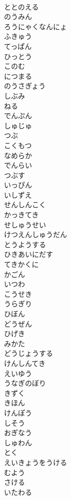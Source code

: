 \documentclass[8pt]{extreport}
\begin{document}
\begin{CJK}{UTF8}{min}
\\	ととのえる
\\	のうみん
\\	ろうにゃくなんにょ
\\	ふきゅう
\\	てっぱん
\\	ひっとう
\\	このむ
\\	につまる
\\	のうさぎょう
\\	しぶみ
\\	ねる
\\	でんぷん
\\	しゅじゅ
\\	つぶ
\\	こくもつ
\\	なめらか
\\	でんらい
\\	つぶす
\\	いっぴん
\\	いしずえ
\\	せんしんこく
\\	かっきてき
\\	せしゅうせい
\\	けつえんしゅうだん
\\	とうようする
\\	ひきあいにだす
\\	てきかくに
\\	かごん
\\	いつわ
\\	こうせき
\\	うらぎり
\\	ひぼん
\\	どうぜん
\\	ひげき
\\	みかた
\\	どうじょうする
\\	けんしんてき
\\	えいゆう
\\	うなぎのぼり
\\	きずく
\\	きほん
\\	けんぽう
\\	しそう
\\	おぎなう
\\	しゅわん
\\	とく
\\	えいきょうをうける
\\	むよう
\\	さける
\\	いたわる

\end{CJK}
\end{document}
